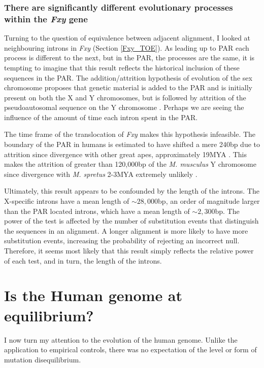 \subsubsection{There are significantly different evolutionary processes within the \textit{Fxy} gene}

Turning to the question of equivalence between adjacent alignment, I looked at neighbouring introns in \textit{Fxy} (Section \ref{Fxy_TOE}). As leading up to PAR each process is different to the next, but in the PAR, the processes are the same, it is tempting to imagine that this result reflects the historical inclusion of these sequences in the PAR. The addition/attrition hypothesis of evolution of the sex chromosome proposes that genetic material is added to the PAR and is initially present on both the X and Y chromosomes, but is followed by attrition of the pseudoautosomal sequence on the Y chromosome  \citep{Graves1995TheGenes}. Perhaps we are seeing the influence of the amount of time each intron spent in the PAR. 

The time frame of the translocation of \textit{Fxy} makes this hypothesis infeasible. The boundary of the PAR in humans is estimated to have shifted a mere 240bp due to attrition since divergence with other great apes, approximately 19MYA \citep{Mensah2014PseudoautosomalPopulation}. This makes the attrition of greater than 120,000bp of the \textit{M. musculus} Y chromosome since divergence with \textit{M. spretus} 2-3MYA extremely unlikely \citep{Huang2005HowMammals}. 

Ultimately, this result appears to be confounded by the length of the introns. The X-specific introns have a mean length of $\sim28,000$bp, an order of magnitude larger than the PAR located introns, which have a mean length of $\sim2,300$bp. The power of the test is affected by the number of substitution events that distinguish the sequences in an alignment. A longer alignment is more likely to have more substitution events, increasing the probability of rejecting an incorrect null. Therefore, it seems most likely that this result simply reflects the relative power of each test, and in turn, the length of the introns. 

\section{Is the Human genome at equilibrium?}

I now turn my attention to the evolution of the human genome. Unlike the application to empirical controls, there was no expectation of the level or form of mutation disequilibrium. 

